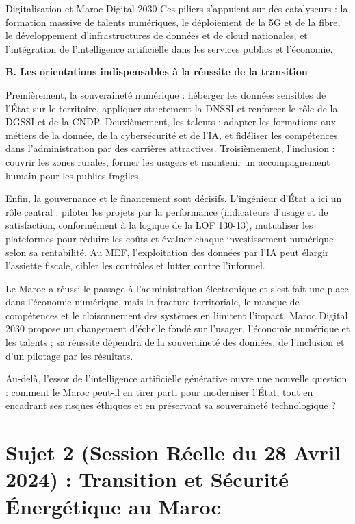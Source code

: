 \begin{copiemodele}{Digitalisation et Maroc Digital 2030}
Ces piliers s'appuient sur des catalyseurs : la formation massive de talents numériques, le déploiement de la 5G et de la fibre, le développement d'infrastructures de données et de cloud nationales, et l'intégration de l'intelligence artificielle dans les services publics et l'économie.

\textbf{B. Les orientations indispensables à la réussite de la transition}

Premièrement, la souveraineté numérique : héberger les données sensibles de l'État sur le territoire, appliquer strictement la DNSSI et renforcer le rôle de la DGSSI et de la CNDP. Deuxièmement, les talents : adapter les formations aux métiers de la donnée, de la cybersécurité et de l'IA, et fidéliser les compétences dans l'administration par des carrières attractives. Troisièmement, l'inclusion : couvrir les zones rurales, former les usagers et maintenir un accompagnement humain pour les publics fragiles.

Enfin, la gouvernance et le financement sont décisifs. L'ingénieur d'État a ici un rôle central : piloter les projets par la performance (indicateurs d'usage et de satisfaction, conformément à la logique de la LOF 130-13), mutualiser les plateformes pour réduire les coûts et évaluer chaque investissement numérique selon sa rentabilité. Au MEF, l'exploitation des données par l'IA peut élargir l'assiette fiscale, cibler les contrôles et lutter contre l'informel.

Le Maroc a réussi le passage à l'administration électronique et s'est fait une place dans l'économie numérique, mais la fracture territoriale, le manque de compétences et le cloisonnement des systèmes en limitent l'impact. Maroc Digital 2030 propose un changement d'échelle fondé sur l'usager, l'économie numérique et les talents ; sa réussite dépendra de la souveraineté des données, de l'inclusion et d'un pilotage par les résultats.

Au-delà, l'essor de l'intelligence artificielle générative ouvre une nouvelle question : comment le Maroc peut-il en tirer parti pour moderniser l'État, tout en encadrant ses risques éthiques et en préservant sa souveraineté technologique ?
\end{copiemodele}

\section{Sujet 2 (Session Réelle du 28 Avril 2024) : Transition et Sécurité Énergétique au Maroc}

